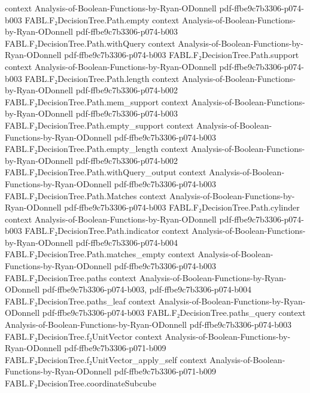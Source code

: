 \begin{theorem}
  {context}
  {Analysis-of-Boolean-Functions-by-Ryan-ODonnell}
  {pdf-ffbe9c7b3306-p074-b003}
\proofstep
  {FABL.F₂DecisionTree.Path.empty}
  {context}
  {Analysis-of-Boolean-Functions-by-Ryan-ODonnell}
  {pdf-ffbe9c7b3306-p074-b003}
\proofstep
  {FABL.F₂DecisionTree.Path.withQuery}
  {context}
  {Analysis-of-Boolean-Functions-by-Ryan-ODonnell}
  {pdf-ffbe9c7b3306-p074-b003}
\proofstep
  {FABL.F₂DecisionTree.Path.support}
  {context}
  {Analysis-of-Boolean-Functions-by-Ryan-ODonnell}
  {pdf-ffbe9c7b3306-p074-b003}
\proofstep
  {FABL.F₂DecisionTree.Path.length}
  {context}
  {Analysis-of-Boolean-Functions-by-Ryan-ODonnell}
  {pdf-ffbe9c7b3306-p074-b002}
\proofstep
  {FABL.F₂DecisionTree.Path.mem_support}
  {context}
  {Analysis-of-Boolean-Functions-by-Ryan-ODonnell}
  {pdf-ffbe9c7b3306-p074-b003}
\proofstep
  {FABL.F₂DecisionTree.Path.empty_support}
  {context}
  {Analysis-of-Boolean-Functions-by-Ryan-ODonnell}
  {pdf-ffbe9c7b3306-p074-b003}
\proofstep
  {FABL.F₂DecisionTree.Path.empty_length}
  {context}
  {Analysis-of-Boolean-Functions-by-Ryan-ODonnell}
  {pdf-ffbe9c7b3306-p074-b002}
\proofstep
  {FABL.F₂DecisionTree.Path.withQuery_output}
  {context}
  {Analysis-of-Boolean-Functions-by-Ryan-ODonnell}
  {pdf-ffbe9c7b3306-p074-b003}
\proofstep
  {FABL.F₂DecisionTree.Path.Matches}
  {context}
  {Analysis-of-Boolean-Functions-by-Ryan-ODonnell}
  {pdf-ffbe9c7b3306-p074-b003}
\proofstep
  {FABL.F₂DecisionTree.Path.cylinder}
  {context}
  {Analysis-of-Boolean-Functions-by-Ryan-ODonnell}
  {pdf-ffbe9c7b3306-p074-b003}
\proofstep
  {FABL.F₂DecisionTree.Path.indicator}
  {context}
  {Analysis-of-Boolean-Functions-by-Ryan-ODonnell}
  {pdf-ffbe9c7b3306-p074-b004}
\proofstep
  {FABL.F₂DecisionTree.Path.matches_empty}
  {context}
  {Analysis-of-Boolean-Functions-by-Ryan-ODonnell}
  {pdf-ffbe9c7b3306-p074-b003}
\proofstep
  {FABL.F₂DecisionTree.paths}
  {context}
  {Analysis-of-Boolean-Functions-by-Ryan-ODonnell}
  {pdf-ffbe9c7b3306-p074-b003,
    pdf-ffbe9c7b3306-p074-b004}
\proofstep
  {FABL.F₂DecisionTree.paths_leaf}
  {context}
  {Analysis-of-Boolean-Functions-by-Ryan-ODonnell}
  {pdf-ffbe9c7b3306-p074-b003}
\proofstep
  {FABL.F₂DecisionTree.paths_query}
  {context}
  {Analysis-of-Boolean-Functions-by-Ryan-ODonnell}
  {pdf-ffbe9c7b3306-p074-b003}
\proofstep
  {FABL.F₂DecisionTree.f₂UnitVector}
  {context}
  {Analysis-of-Boolean-Functions-by-Ryan-ODonnell}
  {pdf-ffbe9c7b3306-p071-b009}
\proofstep
  {FABL.F₂DecisionTree.f₂UnitVector_apply_self}
  {context}
  {Analysis-of-Boolean-Functions-by-Ryan-ODonnell}
  {pdf-ffbe9c7b3306-p071-b009}
\proofstep
  {FABL.F₂DecisionTree.coordinateSubcube}

\end{theorem}
